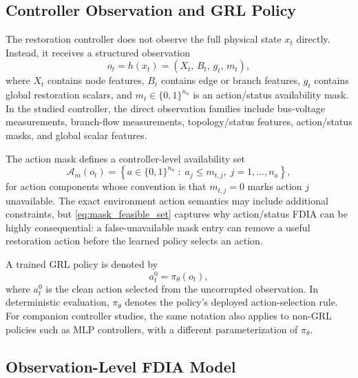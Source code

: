 \subsection{Controller Observation and GRL Policy}
\label{subsec:observation_policy}

The restoration controller does not observe the full physical state $x_t$ directly. Instead, it receives a structured observation
\begin{equation}
    o_t = h(x_t)
    =
    \left(
        X_t,\,
        B_t,\,
        g_t,\,
        m_t
    \right),
    \label{eq:observation}
\end{equation}
where $X_t$ contains node features, $B_t$ contains edge or branch features, $g_t$ contains global restoration scalars, and $m_t \in \{0,1\}^{n_a}$ is an action/status availability mask. In the studied controller, the direct observation families include bus-voltage measurements, branch-flow measurements, topology/status features, action/status masks, and global scalar features.

The action mask defines a controller-level availability set
\begin{equation}
    \mathcal{A}_m(o_t)
    =
    \left\{
        a \in \{0,1\}^{n_a}
        \;:\;
        a_j \leq m_{t,j},
        \; j=1,\ldots,n_a
    \right\},
    \label{eq:mask_feasible_set}
\end{equation}
for action components whose convention is that $m_{t,j}=0$ marks action $j$ unavailable. The exact environment action semantics may include additional constraints, but \eqref{eq:mask_feasible_set} captures why action/status FDIA can be highly consequential: a false-unavailable mask entry can remove a useful restoration action before the learned policy selects an action.

A trained GRL policy is denoted by
\begin{equation}
    a_t^{0} = \pi_{\theta}(o_t),
    \label{eq:clean_action}
\end{equation}
where $a_t^{0}$ is the clean action selected from the uncorrupted observation. In deterministic evaluation, $\pi_{\theta}$ denotes the policy's deployed action-selection rule. For companion controller studies, the same notation also applies to non-GRL policies such as MLP controllers, with a different parameterization of $\pi_{\theta}$.

\subsection{Observation-Level FDIA Model}
\label{subsec:fdia_model}

